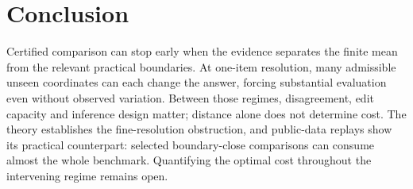 \section{Conclusion}\label{sec:8}\label{conclusion}

Certified comparison can stop early when the evidence separates the finite mean from the relevant practical boundaries. At one-item resolution, many admissible unseen coordinates can each change the answer, forcing substantial evaluation even without observed variation. Between those regimes, disagreement, edit capacity and inference design matter; distance alone does not determine cost. The theory establishes the fine-resolution obstruction, and public-data replays show its practical counterpart: selected boundary-close comparisons can consume almost the whole benchmark. Quantifying the optimal cost throughout the intervening regime remains open.
